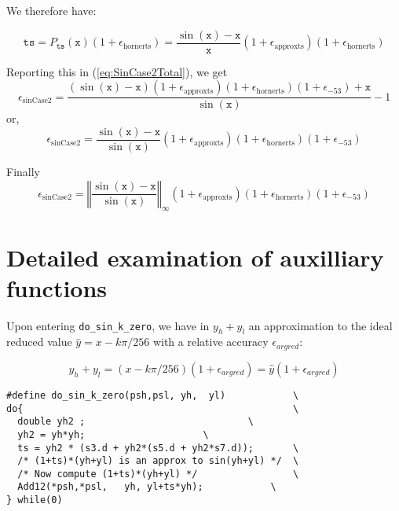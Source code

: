 We therefore have:

$$\mathtt{ts} = P_{\mathtt{ts}}(\mathtt{x})(1+\epsilon_{\mathrm{hornerts}}) = \frac{\sin(\mathtt{x})-\mathtt{x}}{\mathtt{x}}(1+\epsilon_{\mathrm{approxts}})(1+\epsilon_{\mathrm{hornerts}})$$

Reporting this in (\ref{eq:SinCase2Total}), we get 
\begin{equation*}
  \epsilon_{\mathrm{sinCase2}} = \frac{(\sin(\mathtt{x})-\mathtt{x})(1+\epsilon_{\mathrm{approxts}})(1+\epsilon_{\mathrm{hornerts}})(1+\epsilon_{-53}) + \mathtt{x}}{\sin(\mathtt{x})} -1
\end{equation*}
or,
\begin{equation*}
  \epsilon_{\mathrm{sinCase2}} =  \frac{\sin(\mathtt{x})-\mathtt{x}}{\sin(\mathtt{x})}(1+\epsilon_{\mathrm{approxts}})(1+\epsilon_{\mathrm{hornerts}})(1+\epsilon_{-53})
\end{equation*}

Finally
\begin{equation}
  \epsilon_{\mathrm{sinCase2}} =  \left\Vert\frac{\sin(\mathtt{x})-\mathtt{x}}{\sin(\mathtt{x})}\right\Vert_{\infty}(1+\epsilon_{\mathrm{approxts}})(1+\epsilon_{\mathrm{hornerts}})(1+\epsilon_{-53})
  \label{eq:SinCase2Total2}
\end{equation}
 




\section{Detailed examination of auxilliary functions}

Upon entering \texttt{do\_sin\_k\_zero}, we have in $y_h+y_l$ an
approximation to the ideal reduced value $\hat{y}=x-k\pi/256$ with a
relative accuracy $\epsilon_{argred}$:

$$y_h+y_l = (x-k\pi/256)(1+\epsilon_{argred}) = \hat{y}(1+\epsilon_{argred}) $$


\begin{lstlisting}[caption={do\_sin\_k\_zero},firstnumber=1]
#define do_sin_k_zero(psh,psl, yh,  yl)            \
do{                                                \
  double yh2 ;	              			   \
  yh2 = yh*yh;					   \
  ts = yh2 * (s3.d + yh2*(s5.d + yh2*s7.d));	   \
  /* (1+ts)*(yh+yl) is an approx to sin(yh+yl) */  \
  /* Now compute (1+ts)*(yh+yl) */                 \
  Add12(*psh,*psl,   yh, yl+ts*yh);	           \
} while(0)						   
\end{lstlisting}

